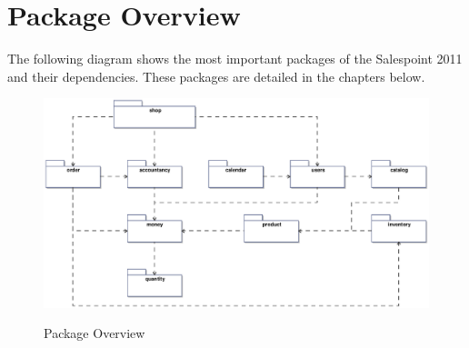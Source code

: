 \section{Package Overview}
The following diagram shows the most important packages of the Salespoint 2011 and their dependencies. These packages are detailed in the chapters below.

\begin{figure}[ht]
	\centering
  \includegraphics[width=1.0\textwidth]{images/Package_Overview.eps}
	\label{package_overview}
	\caption{Package Overview}
\end{figure}